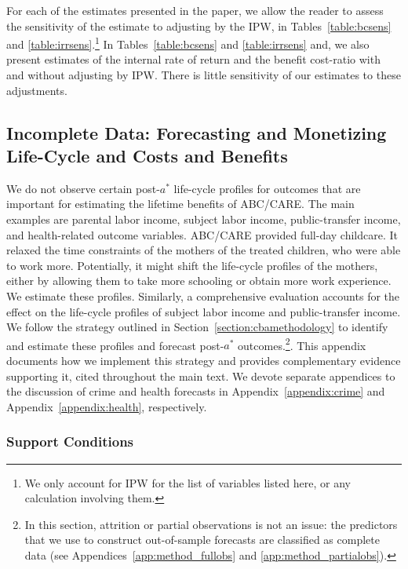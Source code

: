 \noindent For each of the estimates presented in the paper, we allow the reader to assess the sensitivity of the estimate to adjusting by the IPW, in Tables~\ref{table:bcsens} and \ref{table:irrsens}.\footnote{We only account for IPW for the list of variables listed here, or any calculation involving them.} In Tables~\ref{table:bcsens} and \ref{table:irrsens} and, we also present estimates of the internal rate of return and the benefit cost-ratio with and without adjusting by IPW. There is little sensitivity of our estimates to these adjustments.

\subsection{Incomplete Data: Forecasting and Monetizing Life-Cycle and Costs and Benefits} \label{appendix:incomplete}
\label{app:method_noobs}

\noindent We do not observe certain post-$a^*$ life-cycle profiles for outcomes that are important for estimating the lifetime benefits of ABC/CARE. The main examples are parental labor income, subject labor income, public-transfer income, and health-related outcome variables. ABC/CARE provided full-day childcare. It relaxed the time constraints of the mothers of the treated children, who were able to work more. Potentially, it might shift the life-cycle profiles of the mothers, either by allowing them to take more schooling or obtain more work experience. We estimate these profiles. Similarly, a comprehensive evaluation accounts for the effect on the life-cycle profiles of subject labor income and public-transfer income. We follow the strategy outlined in Section~\ref{section:cbamethodology} to identify and estimate these profiles and forecast post-$a^\ast$ outcomes.\footnote{In this section, attrition or partial observations is not an issue: the predictors that we use to construct out-of-sample forecasts are classified as complete data (see Appendices~\ref{app:method_fullobs} and \ref{app:method_partialobs}).}. This appendix documents how we implement this strategy and provides complementary evidence supporting it, cited throughout the main text. We devote separate appendices to the discussion of crime and health forecasts in Appendix~\ref{appendix:crime} and Appendix~\ref{appendix:health}, respectively.

\subsubsection{Support Conditions}

